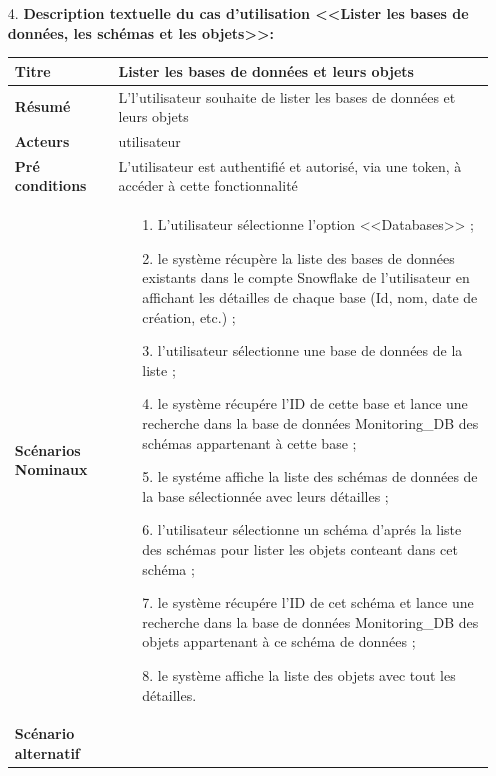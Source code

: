 \begin{enumerate}
        \item[4.] \textbf{Description textuelle du cas d'utilisation <<Lister les bases de données, les schémas et les objets>>:}
    \begin{table}[H]
        \centering
        \begin{tabular}{|p{3.5cm}|p{12cm}|}
            \hline \textbf{Titre} &  Lister les bases de données et leurs objets\\
            \hline \textbf{Résumé} & L'l'utilisateur souhaite de lister les bases de données et leurs objets \\
            \hline \textbf{Acteurs} & utilisateur \\
            \hline \textbf{Pré conditions }& L'utilisateur est authentifié et autorisé, via une token, à accéder à cette fonctionnalité\\
            \hline \textbf{Scénarios Nominaux} &
                \begin{enumerate}
                    \item [1.] L'utilisateur sélectionne l'option <<Databases>> ;
                    \item [2.] le système récupère la liste des bases de données existants dans le compte Snowflake de l'utilisateur en affichant les détailles de chaque base (Id, nom, date de création, etc.) ;
                    \item [3.] l'utilisateur sélectionne une base de données de la liste ;
                    \item [4.] le système récupére l'ID de cette base et lance une recherche dans la base de données Monitoring\_DB des schémas appartenant à cette base ;
                    \item [5.] le systéme affiche la liste des schémas de données de la base sélectionnée avec leurs détailles ;
                    \item [6.] l'utilisateur sélectionne un schéma d'aprés la liste des schémas pour lister les objets conteant dans cet schéma ;
                    \item [7.] le système récupére l'ID de cet schéma et lance une recherche dans la base de données Monitoring\_DB des objets appartenant à ce schéma de données ;
                    \item [8.] le système affiche la liste des objets avec tout les détailles.
                \end{enumerate}\\
                    \hline \textbf{Scénario alternatif} & 

\end{tabular}
\end{table}
\end{enumerate}
